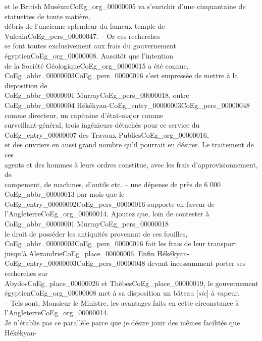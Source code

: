 \documentclass{book}
\begin{document}
{et le British Muséum\gls{CoEg_org_00000005} va s’enrichir d’une cinquantaine de statuettes de toute matière,\\
débris de l’ancienne splendeur du fameux temple de Vulcain\gls{CoEg_pers_00000047}. – Or ces recherches\\
se font toutes exclusivement aux frais du gouvernement égyptien\gls{CoEg_org_00000008}. Aussitôt que l’intention\\
de la Société Géologique\gls{CoEg_org_00000015} a été connue, \gls{CoEg_abbr_00000003}\gls{CoEg_pers_00000016} s’est empressée de mettre à la disposition de\\
\gls{CoEg_abbr_00000001} Murray\gls{CoEg_pers_00000018}, outre \gls{CoEg_abbr_00000004} Hékékyan-\gls{CoEg_entry_00000003}\gls{CoEg_pers_00000048} comme directeur, un capitaine d’état-major comme\\
surveillant-général, trois ingénieurs détachés pour ce service du \gls{CoEg_entry_00000007} des Travaux Publics\gls{CoEg_org_00000016},\\
et des ouvriers en aussi grand nombre qu’il pourrait en désirer. Le traitement de ces\\
agents et des hommes à leurs ordres constitue, avec les frais d’approvisionnement, de\\
campement, de machines, d’outils etc. – une dépense de près de 6 000 \gls{CoEg_abbr_00000013} par mois que le\\
\gls{CoEg_entry_00000002}\gls{CoEg_pers_00000016} supporte en faveur de l’Angleterre\gls{CoEg_org_00000014}. Ajoutez que, loin de contester à \gls{CoEg_abbr_00000001} Murray\gls{CoEg_pers_00000018}\\
le droit de posséder les antiquités provenant de ces fouilles, \gls{CoEg_abbr_00000003}\gls{CoEg_pers_00000016} fait les frais de leur transport\\
jusqu’à Alexandrie\gls{CoEg_place_00000006}. Enfin Hékékyan-\gls{CoEg_entry_00000003}\gls{CoEg_pers_00000048} devant incessamment porter ses recherches sur\\
Abydos\gls{CoEg_place_00000026} et Thèbes\gls{CoEg_place_00000019}, le gouvernement égyptien\gls{CoEg_org_00000008} met à sa disposition un bâteau {[\textit{sic}]} à vapeur.\\
– Tels sont, Monsieur le Ministre, les avantages faits en cette circonstance à l’Angleterre\gls{CoEg_org_00000014}.\\
Je n’établis pas ce parallèle parce que je désire jouir des mêmes facilités que Hékékyan-\\
}
\end{document}
